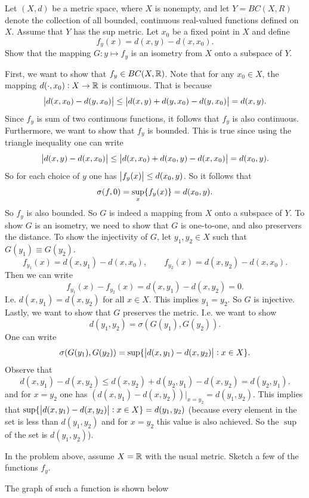 \begin{problem}
	\label{prob:embeddingMetricSpaceInBanachSpace}
	Let $ (X,d) $ be a metric space, where $ X $ is nonempty, and let $ Y = BC(X,R) $
 denote the collection of all bounded, continuous real-valued functions defined on $ X $. Assume that $ Y $ has the sup metric. Let $ x_0 $ be a fixed point in $ X $ and define
 \[ f_y(x) = d(x,y) - d(x,x_0). \]
 Show that the mapping $ G:y\mapsto f_y $ is an isometry from $ X $ onto a subspace of $ Y $.
\end{problem}
\begin{solution}
	First, we want to show that $ f_y \in BC(X,\mathbb{R})  $. Note that for any $ x_0 \in X $, the mapping $ d(\cdot,x_0): X\to \mathbb{R} $ is continuous. That is because
	\[ \left|d(x,x_0) -d(y,x_0)\right| \leq \left|d(x,y) + d(y,x_0) - d(y,x_0)\right| = d(x,y). \]
	Since $ f_y $ is sum of two continuous functions, it follows that $ f_y $ is also continuous. Furthermore, we want to show that $ f_y $ is bounded. This is true since using the triangle inequality one can write
	\[ \left|d(x,y) - d(x,x_0)\right| \leq \left|d(x,x_0) + d(x_0,y) - d(x,x_0) \right| = d(x_0,y). \]
	So for each choice of $ y $ one has $ \left|f_y(x)\right| \leq d(x_0,y) $. So it follows that
	\[ \sigma(f,0) = \sup_x\{f_y(x)\} = d(x_0,y). \]
	So $ f_y $  is also bounded. So $ G $ is indeed a mapping from $ X $ onto a subspace of $ Y $. To show $ G $ is an isometry, we need to show that $ G $ is one-to-one, and also preservers the distance. To show the injectivity of $ G $, let $ y_1,y_2 \in X $ such that $ G(y_1) \equiv G(y_2) $.
	\[ f_{y_1}(x) = d(x,y_1) - d(x,x_0) ,\qquad f_{y_2}(x) = d(x,y_2)-d(x,x_0). \]
	Then we can write
	\[ f_{y_1}(x) - f_{y_2}(x) = d(x,y_1)-d(x,y_2) = 0. \]
	I.e. $ d(x,y_1) = d(x,y_2) $ for all $ x\in X $. This implies $ y_1=y_2 $.
	So $ G $ is injective. Lastly, we want to show that $ G $ preserves the metric. I.e. we want to show
	\[ d(y_1,y_2) = \sigma(G(y_1),G(y_2)). \]
	One can write 
	\[ \sigma(G(y_1),G(y_2)) = \sup\{\left|d(x,y_1)-d(x,y_2)\right|: x\in X\}. \]
	Observe that
	\[ d(x,y_1) - d(x,y_2) \leq d(x,y_2) + d(y_2,y_1) - d(x,y_2) = d(y_2,y_1). \]
	and for $ x=y_2 $ one has $ (d(x,y_1) - d(x,y_2))\big|_{x=y_2} = d(y_1,y_2) $. This implies that $ \sup\{\left|d(x,y_1)-d(x,y_2)\right|: x\in X\} = d(y_1,y_2) $ (because every element in the set is less than $ d(y_1,y_2) $ and for $ x=y_2 $ this value is also achieved. So the $ \sup $ of the set is $ d(y_1,y_2) $).
\end{solution}
 
 \begin{problem}
 	In the problem above, assume $ X=\mathbb{R} $ with the usual metric. Sketch a few of the functions $ f_y $.
 \end{problem}
 \begin{solution}
 	The graph of such a function is shown below
 	
 \end{solution}
 
